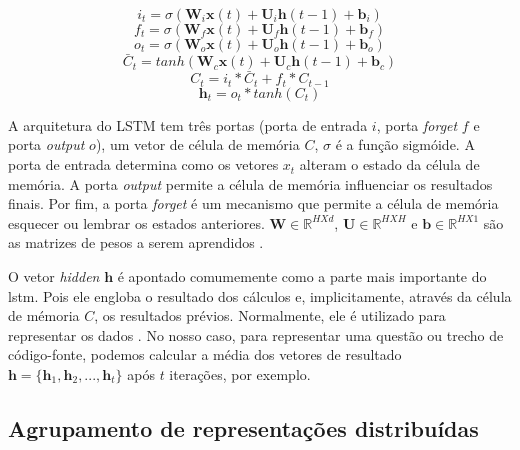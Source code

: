 \begin{equation}
    i_{t} = \sigma(\bm{W}_{i}\bm{x}(t) + \bm{U}_{i}\bm{h}(t - 1) + \bm{b}_{i})
\end{equation}
\begin{equation}
    f_{t} = \sigma(\bm{W}_{f}\bm{x}(t) + \bm{U}_{f}\bm{h}(t - 1) + \bm{b}_{f})
\end{equation}
\begin{equation}
    o_{t} = \sigma(\bm{W}_{o}\bm{x}(t) + \bm{U}_{o}\bm{h}(t - 1) + \bm{b}_{o})
\end{equation}
\begin{equation}
    \bar{C}_{t} = tanh(\bm{W}_{c}\bm{x}(t) + \bm{U}_{c}\bm{h}(t - 1) + \bm{b}_{c})
\end{equation}
\begin{equation}
    C_{t} = i_{t} * \bar{C}_t + f_{t} * C_{t - 1}
\end{equation}
\begin{equation}
    \bm{h}_{t} = o_{t} * tanh(C_{t})
\end{equation}

A arquitetura do LSTM tem três portas (porta de entrada $i$, porta \textit{forget} $f$ e porta \textit{output} $o$), um vetor de célula de memória $C$, $\sigma$ é a função sigmóide. A porta de entrada determina como os vetores $x_{t}$ alteram o estado da célula de memória. A porta \textit{output} permite a célula de memória influenciar os resultados finais. Por fim, a porta \textit{forget} é um mecanismo que permite a célula de memória esquecer ou lembrar os estados anteriores. $\bm{W} \in \mathbb{R}^{H X d}$, $\bm{U} \in \mathbb{R}^{H X H}$ e $\bm{b} \in \mathbb{R}^{H X 1}$ são as matrizes de pesos a serem aprendidos \citep{tan-lstm-qa}.

O vetor \textit{hidden} $\bm{h}$ é apontado comumemente como a parte mais importante do \acrshort{lstm}. Pois ele engloba o resultado dos cálculos e, implicitamente, através da célula de mémoria $C$, os resultados prévios. Normalmente, ele é utilizado para representar os dados \citep{tom-young:trends-deep-learning-nlp}.
No nosso caso, para representar uma questão ou trecho de código-fonte, podemos calcular a média dos vetores de resultado $\bm{h} = \{ \bm{h}_{1}, \bm{h}_{2}, . . ., \bm{h}_t \}$ após $t$ iterações, por exemplo.

\subsection{Agrupamento de representações distribuídas}

